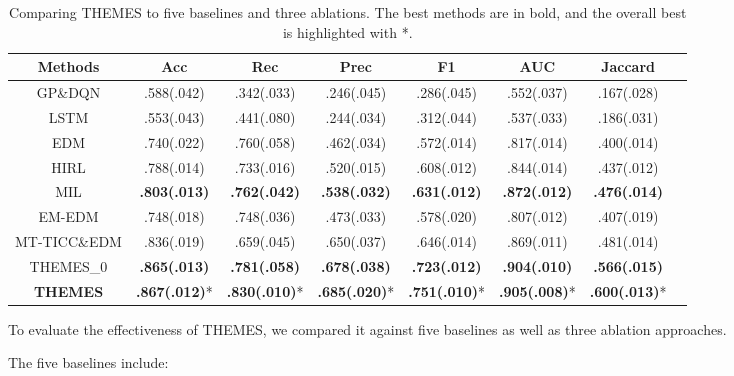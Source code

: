 \documentclass{article}
\begin{document}
\renewcommand{\arraystretch}{1.2}
\setlength\tabcolsep{3pt}
\begin{table}
\footnotesize
    \centering
    \setlength\tabcolsep{5pt}
    \begin{tabular}{c|ccccccc|} \hline
        \textbf{Methods} & \textbf{Acc} & \textbf{Rec} & \textbf{Prec} & \textbf{F1} & \textbf{AUC} & \textbf{Jaccard} \\
        \hline
        GP\&DQN \cite{azizsoltani2019unobserved} & .588(.042) & .342(.033) & .246(.045) & .286(.045) & .552(.037) & .167(.028) \\ 
        LSTM \cite{duan2017one} & .553(.043) & .441(.080) & .244(.034) & .312(.044) & .537(.033) & .186(.031)  \\ 
        EDM \cite{jarrett2020strictly} & .740(.022) & .760(.058) & .462(.034) & .572(.014) & .817(.014) & .400(.014) \\ 
        HIRL \cite{krishnan2016hirl} & .788(.014) & .733(.016) & .520(.015) & .608(.012) & .844(.014) & .437(.012) \\
        MIL \cite{hausman2017multi} & \textbf{.803(.013)} & \textbf{.762(.042)} & \textbf{.538(.032)} & \textbf{.631(.012)} & \textbf{.872(.012)} & \textbf{.476(.014)} \\  \hline
        
        EM-EDM & .748(.018) & .748(.036) & .473(.033) & .578(.020) & .807(.012) & .407(.019) \\ 
        MT-TICC\&EDM & .836(.019) & .659(.045) & .650(.037) & .646(.014) & .869(.011) & .481(.014) \\ 
        THEMES\_0 & \textbf{.865(.013)} & \textbf{.781(.058)} & \textbf{.678(.038)} & \textbf{.723(.012)} & \textbf{.904(.010)} & \textbf{.566(.015)} \\ \hline %
        
        \textbf{THEMES} & \textbf{.867(.012)}* & \textbf{.830(.010)}* & \textbf{.685(.020)}* & \textbf{.751(.010)}* & \textbf{.905(.008)}* & \textbf{.600(.013)}* \\ \hline 
    \end{tabular}
    \caption{\centering Comparing THEMES to five baselines and three ablations. The best methods are in bold, and the overall best is highlighted with *. }
    \label{tab:themes}
\end{table}

To evaluate the effectiveness of THEMES, we compared it against five baselines as well as three ablation approaches. 

\noindent The five baselines include: 
\end{document}
